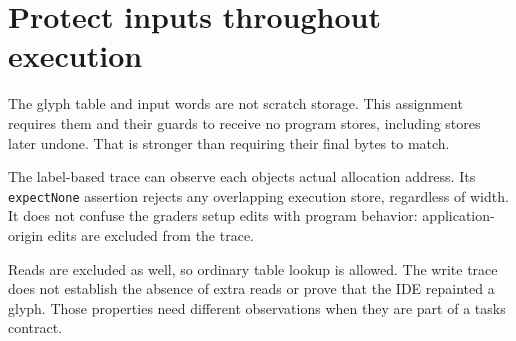 \section{Protect inputs throughout
  execution}\label{005-seven-segment-counter-p09-protect-inputs-throughout-execution}

The glyph table and input words are not scratch storage. This assignment
requires them and their guards to receive no program stores, including
stores later undone. That is stronger than requiring their final bytes
to match.

The label-based trace can observe each object\textquotesingle s actual
allocation address. Its \texttt{expectNone} assertion rejects any
overlapping execution store, regardless of width. It does not confuse
the grader\textquotesingle s setup edits with program behavior:
application-origin edits are excluded from the trace.

Reads are excluded as well, so ordinary table lookup is allowed. The
write trace does not establish the absence of extra reads or prove that
the IDE repainted a glyph. Those properties need different observations
when they are part of a task\textquotesingle s contract.
